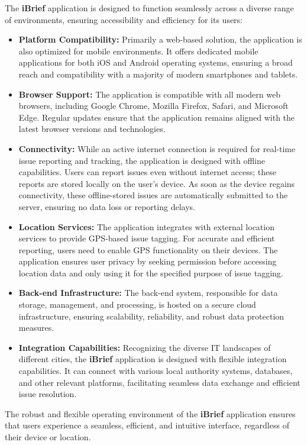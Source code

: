 The \textbf{iBrief} application is designed to function seamlessly across a diverse range of environments, ensuring accessibility and efficiency for its users:

\begin{itemize}
    \item \textbf{Platform Compatibility:} Primarily a \gls{web-based} solution, the application is also optimized for mobile environments. It offers dedicated mobile applications for both \gls{iOS} and \gls{Android} operating systems, ensuring a broad reach and compatibility with a majority of modern smartphones and tablets.

    \item \textbf{Browser Support:} The application is compatible with all modern web browsers, including Google Chrome, Mozilla Firefox, Safari, and Microsoft Edge. Regular updates ensure that the application remains aligned with the latest browser versions and technologies.

    \item \textbf{Connectivity:} While an active internet connection is required for real-time issue reporting and tracking, the application is designed with offline capabilities. Users can report issues even without internet access; these reports are stored locally on the user's device. As soon as the device regains connectivity, these offline-stored issues are automatically submitted to the server, ensuring no data loss or reporting delays.

    \item \textbf{Location Services:} The application integrates with external location services to provide GPS-based issue tagging. For accurate and efficient reporting, users need to enable GPS functionality on their devices. The application ensures user privacy by seeking permission before accessing location data and only using it for the specified purpose of issue tagging.

    \item \textbf{Back-end Infrastructure:} The \gls{back-end} system, responsible for data storage, management, and processing, is hosted on a secure cloud infrastructure, ensuring scalability, reliability, and robust data protection measures.

    \item \textbf{Integration Capabilities:} Recognizing the diverse IT landscapes of different cities, the \textbf{iBrief} application is designed with flexible integration capabilities. It can connect with various local authority systems, databases, and other relevant platforms, facilitating seamless data exchange and efficient issue resolution.
\end{itemize}

The robust and flexible operating environment of the \textbf{iBrief} application ensures that users experience a seamless, efficient, and intuitive interface, regardless of their device or location.
